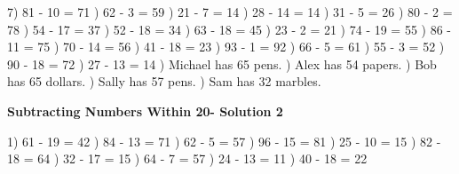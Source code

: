 \documentclass{article}%
\begin{document}
7) 81 {-} 10 = 71%
) 62 {-} 3 = 59%
) 21 {-} 7 = 14%
) 28 {-} 14 = 14%
) 31 {-} 5 = 26%
) 80 {-} 2 = 78%
) 54 {-} 17 = 37%
) 52 {-} 18 = 34%
) 63 {-} 18 = 45%
) 23 {-} 2 = 21%
) 74 {-} 19 = 55%
) 86 {-} 11 = 75%
) 70 {-} 14 = 56%
) 41 {-} 18 = 23%
) 93 {-} 1 = 92%
) 66 {-} 5 = 61%
) 55 {-} 3 = 52%
) 90 {-} 18 = 72%
) 27 {-} 13 = 14%
) Michael has 65 pens.%
) Alex has 54 papers.%
) Bob has 65 dollars.%
) Sally has 57 pens.%
) Sam has 32 marbles.%
\newline%
\newpage%
\large%
\begin{center}%
\textbf{Subtracting Numbers Within 20- Solution 2}%
\newline%
\end{center} \normalsize%
1) 61 {-} 19 = 42%
) 84 {-} 13 = 71%
) 62 {-} 5 = 57%
) 96 {-} 15 = 81%
) 25 {-} 10 = 15%
) 82 {-} 18 = 64%
) 32 {-} 17 = 15%
) 64 {-} 7 = 57%
) 24 {-} 13 = 11%
) 40 {-} 18 = 22%
\newline%
\end{document}
